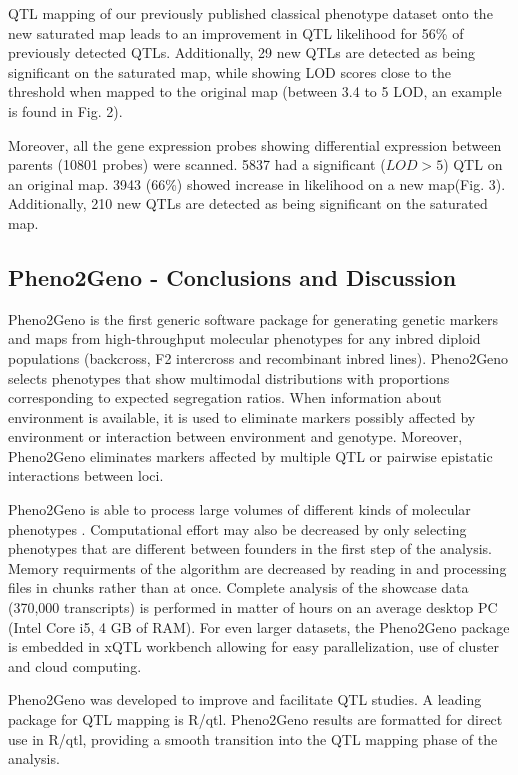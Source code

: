 \documentclass[8pt, twoside, a5paper]{report}
\begin{document}
QTL mapping of our previously published classical phenotype dataset \cite{Joosen:2011} onto the new saturated map leads to 
an improvement in QTL likelihood for 56\% of previously detected QTLs. Additionally, 29 new QTLs are detected 
as being significant on the saturated map, while showing LOD scores close to the threshold when mapped to the original 
map (between 3.4 to 5 LOD, an example is found in Fig. 2).

Moreover, all the gene expression probes showing differential expression between parents (10801 probes) were scanned. 5837
had a significant ($LOD > 5$) QTL on an original map. 3943 (66\%) showed increase in likelihood on a new map(Fig. 3). 
Additionally, 210 new QTLs are detected as being significant on the saturated map.
  
\subsection{Pheno2Geno - Conclusions and Discussion}
Pheno2Geno is the first generic software package for generating genetic markers and maps from high-throughput molecular 
phenotypes for any inbred diploid populations (backcross, F2 intercross and recombinant inbred lines). Pheno2Geno selects 
phenotypes that show multimodal distributions with proportions corresponding to expected segregation ratios. When 
information about environment is available, it is used to eliminate markers possibly affected by environment or 
interaction between environment and genotype. Moreover, Pheno2Geno eliminates markers affected by multiple QTL or 
pairwise epistatic interactions between loci.

Pheno2Geno is able to process large volumes of different kinds of molecular phenotypes \cite{Trelles:2011}. Computational 
effort may also be decreased by only selecting phenotypes that are different between founders in the first step of the 
analysis. Memory requirments of the algorithm are decreased by reading in and processing files in chunks rather than at once. 
Complete analysis of the showcase data (370,000 transcripts) is performed in matter of hours on an average 
desktop PC (Intel Core i5, 4 GB of RAM). For even larger datasets, the Pheno2Geno package is embedded in xQTL workbench
\cite{Arends:2012a, arends:2012b} allowing for easy parallelization, use of cluster and cloud computing.\newline

Pheno2Geno was developed to improve and facilitate QTL studies. A leading package for QTL mapping is R/qtl. 
Pheno2Geno results are formatted for direct use in R/qtl, providing a smooth transition into the QTL mapping phase 
of the analysis. \newline
\end{document}
